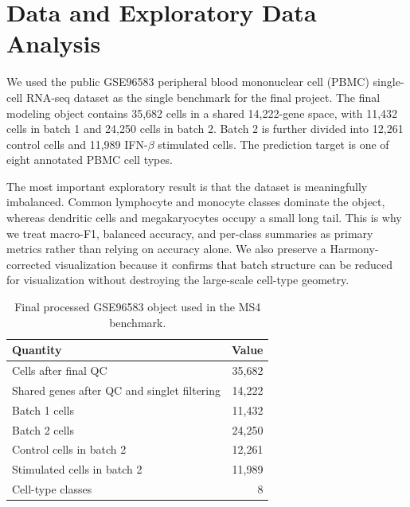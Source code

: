 

\section{Data and Exploratory Data Analysis}

We used the public GSE96583 peripheral blood mononuclear cell (PBMC) single-cell RNA-seq dataset as the single benchmark for the final project. The final modeling object contains 35,682 cells in a shared 14,222-gene space, with 11,432 cells in batch 1 and 24,250 cells in batch 2. Batch 2 is further divided into 12,261 control cells and 11,989 IFN-$\beta$ stimulated cells. The prediction target is one of eight annotated PBMC cell types.

The most important exploratory result is that the dataset is meaningfully imbalanced. Common lymphocyte and monocyte classes dominate the object, whereas dendritic cells and megakaryocytes occupy a small long tail. This is why we treat macro-F1, balanced accuracy, and per-class summaries as primary metrics rather than relying on accuracy alone. We also preserve a Harmony-corrected visualization because it confirms that batch structure can be reduced for visualization without destroying the large-scale cell-type geometry.

\begin{table}[t]
\centering
\caption{Final processed GSE96583 object used in the MS4 benchmark.}
\label{tab:processed-object}
\begin{tabular}{lr}
\toprule
Quantity & Value \\
\midrule
Cells after final QC & 35,682 \\
Shared genes after QC and singlet filtering & 14,222 \\
Batch 1 cells & 11,432 \\
Batch 2 cells & 24,250 \\
Control cells in batch 2 & 12,261 \\
Stimulated cells in batch 2 & 11,989 \\
Cell-type classes & 8 \\
\bottomrule
\end{tabular}
\end{table}

